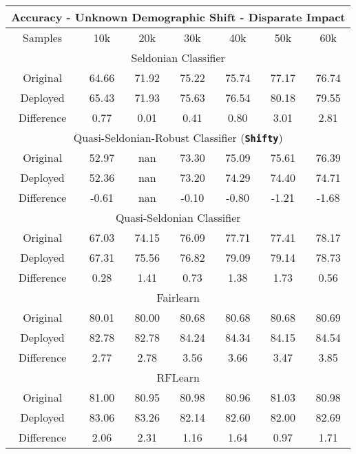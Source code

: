 \begin{table}[ht]
\footnotesize
\centering
\begin{tabular}{|c|cccccc|}
\hline
\multicolumn{7}{|c|}{Accuracy - Unknown Demographic Shift - Disparate Impact} \\ \hline \hline

Samples & 10k & 20k & 30k & 40k & 50k & 60k \\ \hline

\multicolumn{7}{|c|}{Seldonian Classifier} \\ 
\hline Original & 64.66 & 71.92 & 75.22 & 75.74 & 77.17 & 76.74 \\ \hline
Deployed & 65.43 & 71.93 & 75.63 & 76.54 & 80.18 & 79.55 \\ \hline
Difference & 0.77 & 0.01 & 0.41 & 0.80 & 3.01 & 2.81 \\ \hline

\multicolumn{7}{|c|}{Quasi-Seldonian-Robust Classifier (\textbf{\texttt{Shifty}})} \\ \hline 
Original & 52.97 & nan & 73.30 & 75.09 & 75.61 & 76.39 \\ \hline
Deployed & 52.36 & nan & 73.20 & 74.29 & 74.40 & 74.71 \\ \hline
Difference & -0.61 & nan & -0.10 & -0.80 & -1.21 & -1.68 \\ \hline 

\multicolumn{7}{|c|}{Quasi-Seldonian Classifier} \\ \hline
Original & 67.03 & 74.15 & 76.09 & 77.71 & 77.41 & 78.17 \\ \hline
Deployed & 67.31 & 75.56 & 76.82 & 79.09 & 79.14 & 78.73 \\ \hline
Difference & 0.28 & 1.41 & 0.73 & 1.38 & 1.73 & 0.56 \\ \hline

\multicolumn{7}{|c|}{Fairlearn} \\ \hline
Original & 80.01 & 80.00 & 80.68 & 80.68 & 80.68 & 80.69 \\ \hline
Deployed & 82.78 & 82.78 & 84.24 & 84.34 & 84.15 & 84.54 \\ \hline
Difference & 2.77 & 2.78 & 3.56 & 3.66 & 3.47 & 3.85 \\ \hline

\multicolumn{7}{|c|}{RFLearn} \\ \hline
Original & 81.00 & 80.95 & 80.98 & 80.96 & 81.03 & 80.98 \\ \hline
Deployed & 83.06 & 83.26 & 82.14 & 82.60 & 82.00 & 82.69 \\ \hline
Difference & 2.06 & 2.31 & 1.16 & 1.64 & 0.97 & 1.71 \\ \hline


\end{tabular}
\end{table}
